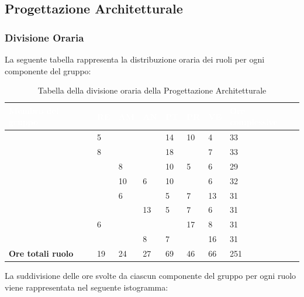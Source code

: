 \subsection{Progettazione Architetturale}

\subsubsection{Divisione Oraria}
La seguente tabella rappresenta la distribuzione oraria dei ruoli per ogni componente del gruppo:
{
\renewcommand{\arraystretch}{2}

\begin{longtable}[h]{ C{5cm} C{1cm} C{1cm} C{1cm} C{1cm} C{1cm} C{1cm} C{3cm}}
\caption{Tabella della divisione oraria della Progettazione Architetturale}\\
	\textcolor{white}{\textbf{Membro del gruppo}} & 
	\textcolor{white}{\textbf{RE}} & 
	\textcolor{white}{\textbf{AM}} & 
	\textcolor{white}{\textbf{AN}} & 
	\textcolor{white}{\textbf{PT}} & 
	\textcolor{white}{\textbf{PR}} & 
	\textcolor{white}{\textbf{VE}} & 
	\textcolor{white}{\textbf{Ore complessive}}\\	
	\endhead
        
    \MC{} & 5 & & & 14 & 10 & 4 & 33\\
    \LD{} & 8 & & & 18 & & 7 & 33 \\
    \CE{} & & 8 & & 10 & 5 & 6 & 29 \\
    \SE{} & & 10 & 6 & 10 & & 6 & 32 \\
    \PF{} & & 6 & & 5 & 7 & 13 &  31\\
    \DF{} & & & 13 & 5 & 7 & 6 & 31 \\
    \BR{} & 6 & & & & 17 & 8 & 31\\
   \AT{} & & & 8 & 7 & & 16 & 31\\
	\textbf{Ore totali ruolo} & 19 & 24 & 27 & 69 & 46 & 66 & 251\\
		
	\end{longtable}
}

La suddivisione delle ore svolte da ciascun componente del gruppo per ogni ruolo viene rappresentata nel seguente istogramma:

